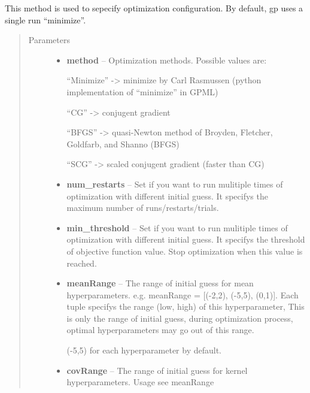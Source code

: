 \documentclass[letterpaper,10pt,english]{sphinxmanual}
\begin{document}
\begin{fulllineitems}
\begin{fulllineitems}
\end{fulllineitems}


\begin{fulllineitems}
\label{pyGPs.Core:pyGPs.Core.gp.GP.setOptimizer}
This method is used to sepecify optimization configuration. By default, gp uses a single run ``minimize''.
\begin{quote}\begin{description}
\item[{Parameters}] \leavevmode\begin{itemize}
\item {} 
\textbf{method} -- 
Optimization methods. Possible values are:

``Minimize''   -\textgreater{} minimize by Carl Rasmussen (python implementation of ``minimize'' in GPML)

``CG''         -\textgreater{} conjugent gradient

``BFGS''       -\textgreater{} quasi-Newton method of Broyden, Fletcher, Goldfarb, and Shanno (BFGS)

``SCG''        -\textgreater{} scaled conjugent gradient (faster than CG)


\item {} 
\textbf{num\_restarts} -- Set if you want to run mulitiple times of optimization with different initial guess. 
It specifys the maximum number of runs/restarts/trials.

\item {} 
\textbf{min\_threshold} -- Set if you want to run mulitiple times of optimization with different initial guess. 
It specifys the threshold of objective function value. Stop optimization when this value is reached.

\item {} 
\textbf{meanRange} -- 
The range of initial guess for mean hyperparameters. 
e.g. meanRange = {[}(-2,2), (-5,5), (0,1){]}.
Each tuple specifys the range (low, high) of this hyperparameter,
This is only the range of initial guess, during optimization process, optimal hyperparameters may go out of this range.

(-5,5) for each hyperparameter by default.


\item {} 
\textbf{covRange} -- The range of initial guess for kernel hyperparameters. Usage see meanRange


\end{itemize}
\end{description}
\end{quote}
\end{fulllineitems}
\end{fulllineitems}
\end{document}

